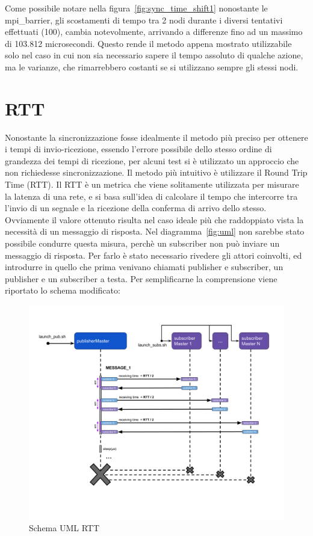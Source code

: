 Come possibile notare nella figura~\ref{fig:sync_time_shift1} nonostante le mpi\_barrier, gli scostamenti di tempo tra 2 nodi durante i diversi tentativi effettuati (100), cambia notevolmente, arrivando a differenze fino ad un massimo di 103.812 microsecondi. Questo rende il metodo appena mostrato utilizzabile solo nel caso in cui non sia necessario sapere il tempo assoluto di qualche azione, ma le varianze, che rimarrebbero costanti se si utilizzano sempre gli stessi nodi.


\section{RTT}\label{sec:timeRTT}
Nonostante la sincronizzazione fosse idealmente il metodo più preciso per ottenere i tempi di invio-ricezione, essendo l'errore possibile dello stesso ordine di grandezza dei tempi di ricezione, per alcuni test si è utilizzato un approccio che non richiedesse sincronizzazione. Il metodo più intuitivo è utilizzare il Round Trip Time (RTT).
Il RTT è un metrica che viene solitamente utilizzata per misurare la latenza di una rete, e si basa sull'idea di calcolare il tempo che intercorre tra l'invio di un segnale e la ricezione della conferma di arrivo dello stesso. Ovviamente il valore ottenuto risulta nel caso ideale più che raddoppiato vista la necessità di un messaggio di risposta. Nel diagramma~\ref{fig:uml} non sarebbe stato possibile condurre questa misura, perchè un subscriber non può inviare un messaggio di risposta.
Per farlo è stato necessario rivedere gli attori coinvolti, ed introdurre in quello che prima venivano chiamati publisher e subscriber, un publisher e un subscriber a testa.
Per semplificarne la comprensione viene riportato lo schema modificato:

\begin{figure}[H]
    \includegraphics[width=\textwidth]{./img/RTT.png}
    \caption{Schema UML RTT}\label{fig:rtt_uml}
\end{figure} 

